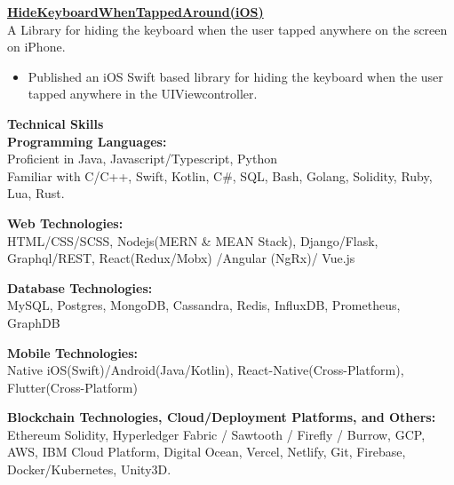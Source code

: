 \documentclass{article}
\begin{document}
\noindent \normalsize \href{https://bit.ly/3a62RB4}{\textbf{HideKeyboardWhenTappedAround(iOS)}} \\
\noindent \normalsize A Library for hiding the keyboard when the user tapped anywhere on the screen on iPhone.
\begin{itemize}
    \item Published an iOS Swift based library for hiding the keyboard when the user tapped anywhere in the UIViewcontroller.
\end{itemize}
\vspace{5pt}

\noindent \large \textbf{\textcolor{NavyBlue}{Technical Skills}} \vspace{5pt} \\
\noindent \normalsize \textbf{Programming Languages:} \\
\noindent \normalsize Proficient in Java, Javascript/Typescript, Python \\
\noindent \normalsize Familiar with C/C++, Swift, Kotlin, C\#, SQL, Bash, Golang, Solidity, Ruby, Lua, Rust.
\vspace{5pt}

\noindent \normalsize \textbf{Web Technologies:} \\
\noindent \normalsize HTML/CSS/SCSS, Nodejs(MERN \& MEAN Stack), Django/Flask, Graphql/REST, React(Redux/Mobx) /Angular (NgRx)/ Vue.js
\vspace{5pt}

\noindent \normalsize \textbf{Database Technologies:} \\
\noindent \normalsize MySQL, Postgres, MongoDB, Cassandra, Redis, InfluxDB, Prometheus, GraphDB
\vspace{5pt}

\noindent \normalsize \textbf{Mobile Technologies:} \\
\noindent \normalsize Native iOS(Swift)/Android(Java/Kotlin), React-Native(Cross-Platform), Flutter(Cross-Platform)
\vspace{5pt}

\noindent \normalsize \textbf{Blockchain Technologies, Cloud/Deployment Platforms, and Others:}\\
\noindent \normalsize Ethereum Solidity, Hyperledger Fabric / Sawtooth / Firefly / Burrow, GCP, AWS, IBM Cloud Platform, Digital Ocean, Vercel, Netlify, Git, Firebase, Docker/Kubernetes, Unity3D.
\end{document}
